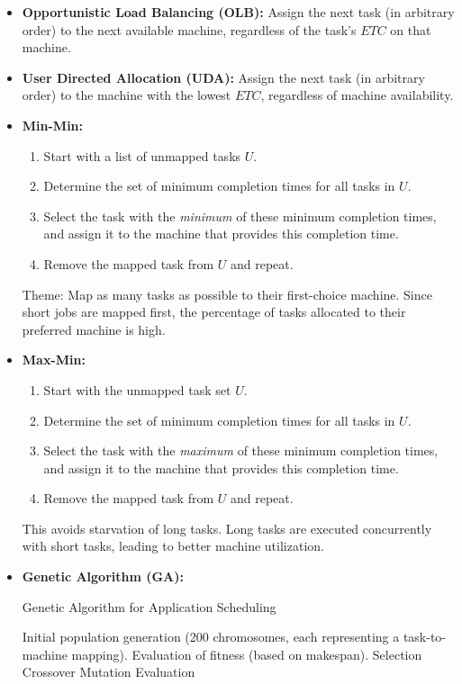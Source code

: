 \documentclass[12pt]{book}
\begin{document}
\begin{itemize}
    \item \textbf{Opportunistic Load Balancing (OLB):} Assign the next task (in arbitrary order) to the next available machine, regardless of the task's $ETC$ on that machine.
    
    \item \textbf{User Directed Allocation (UDA):} Assign the next task (in arbitrary order) to the machine with the lowest $ETC$, regardless of machine availability.
    
    \item \textbf{Min-Min:}  
    \begin{enumerate}
        \item Start with a list of unmapped tasks $U$.
        \item Determine the set of minimum completion times for all tasks in $U$.
        \item Select the task with the \emph{minimum} of these minimum completion times, and assign it to the machine that provides this completion time.
        \item Remove the mapped task from $U$ and repeat.
    \end{enumerate}
    Theme: Map as many tasks as possible to their first-choice machine. Since short jobs are mapped first, the percentage of tasks allocated to their preferred machine is high.
    
    \item \textbf{Max-Min:}  
    \begin{enumerate}
        \item Start with the unmapped task set $U$.
        \item Determine the set of minimum completion times for all tasks in $U$.
        \item Select the task with the \emph{maximum} of these minimum completion times, and assign it to the machine that provides this completion time.
        \item Remove the mapped task from $U$ and repeat.
    \end{enumerate}
    This avoids starvation of long tasks. Long tasks are executed concurrently with short tasks, leading to better machine utilization.
    
    \item \textbf{Genetic Algorithm (GA):}  
    \begin{algorithm}[H]
    \caption{Genetic Algorithm for Application Scheduling}
    \begin{algorithmic}[1]
    \State Initial population generation (200 chromosomes, each representing a task-to-machine mapping).
    \State Evaluation of fitness (based on makespan).
        \State Selection
        \State Crossover
        \State Mutation
        \State Evaluation
    \EndWhile
    \end{algorithmic}
    \end{algorithm}


\end{itemize}
\end{document}
